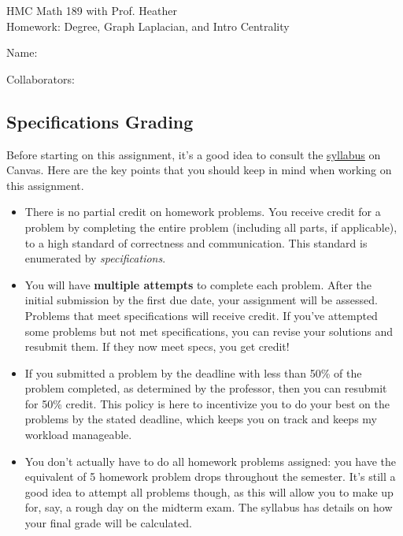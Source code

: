 \documentclass[11pt]{article}
\begin{document}
\begin{titlepage}

HMC Math 189 with Prof. Heather\\ 
Homework: Degree, Graph Laplacian, and Intro Centrality

\bigskip

Name:

\bigskip
Collaborators: 

\subsection*{Specifications Grading}

Before starting on this assignment, it's a good idea to consult the \href{https://harveymuddcollege.instructure.com/courses/1418/assignments/syllabus}{syllabus} on Canvas. 
Here are the key points that you should keep in mind when working on this assignment.
\begin{itemize}
    \item There is no partial credit on homework problems. You receive credit for a problem by completing the entire problem (including all parts, if applicable), to a high standard of correctness and communication. 
    This standard is enumerated by \emph{specifications}. 
    \item You will have \textbf{multiple attempts} to complete each problem. 
    After the initial submission by the first due date, your assignment will be assessed. 
    Problems that meet specifications will receive credit. 
    If you've attempted some problems but not met specifications, you can revise your solutions and resubmit them. 
    If they now meet specs, you get credit! 
    \item If you submitted a problem by the deadline with less than 50\% of the problem completed, as determined by the professor, then you can resubmit for 50\% credit. 
    This policy is here to incentivize you to do your best on the problems by the stated deadline, which keeps you on track and keeps my workload manageable. 
    \item You don't actually have to do all homework problems assigned: you have the equivalent of 5 homework problem drops throughout the semester. 
    It's still a good idea to attempt all problems though, as this will allow you to make up for, say, a rough day on the midterm exam. 
    The syllabus has details on how your final grade will be calculated. 
\end{itemize}

\pagebreak


\end{titlepage}
\end{document}
